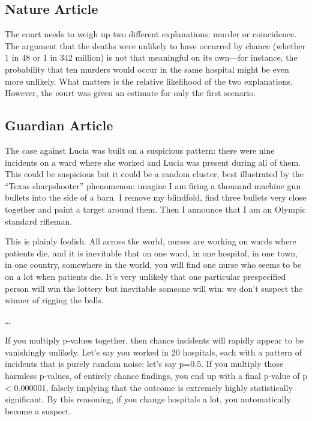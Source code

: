 \documentclass[letterpaper, landscape]{exam}
\begin{document}
  \subsection{Nature Article} %
  
  The court needs to weigh up two different explanations: murder or
  coincidence. The argument that the deaths were unlikely to have occurred by
  chance (whether 1 in 48 or 1 in 342 million) is not that meaningful on its
  own---for instance, the probability that ten murders would occur in the same
  hospital might be even more unlikely. What matters is the relative
  likelihood of the two explanations. However, the court was given an estimate
  for only the first scenario.

  \subsection{Guardian Article} %

  The case against Lucia was built on a suspicious pattern: there were nine
  incidents on a ward where she worked and Lucia was present during all of them.
  This could be suspicious but it could be a random cluster, best illustrated by
  the ``Texas sharpshooter'' phenomenon: imagine I am firing a thousand machine gun
  bullets into the side of a barn. I remove my blindfold, find three bullets
  very close together and paint a target around them. Then I announce that I am
  an Olympic standard rifleman.

  This is plainly foolish. All across the world, nurses are working on wards
  where patients die, and it is inevitable that on one ward, in one hospital, in
  one town, in one country, somewhere in the world, you will find one nurse who
  seems to be on a lot when patients die. It's very unlikely that one particular
  prespecified person will win the lottery but inevitable someone will win: we
  don't suspect the winner of rigging the balls.

  \dots

  If you multiply p-values together, then chance incidents will rapidly appear
  to be vanishingly unlikely. Let's say you worked in 20 hospitals, each with
  a pattern of incidents that is purely random noise: let's say p=0.5. If you
  multiply those harmless p-values, of entirely chance findings, you end up
  with a final p-value of p < 0.000001, falsely implying that the outcome is
  extremely highly statistically significant. By this reasoning, if you change
  hospitals a lot, you automatically become a suspect.
\end{document}
